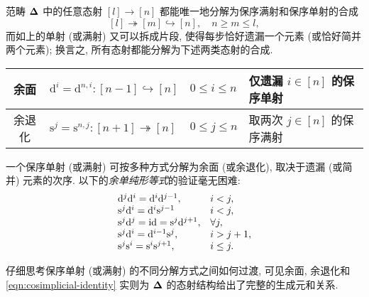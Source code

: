 范畴 $\bm\Delta$ 中的任意态射 $[l] \to [n]$ 都能唯一地分解为保序满射和保序单射的合成
\[ [l] \twoheadrightarrow [m] \hookrightarrow [n], \quad n \geq m \leq l, \]
而如上的单射 (或满射) 又可以拆成片段, 使得每步恰好遗漏一个元素 (或恰好简并两个元素); 换言之, 所有态射都能分解为下述两类态射的合成.
\begin{center}\begin{tabular}{|c|l|l|l|} \hline
	余面 & $\mathrm{d}^i = \mathrm{d}^{n, i}: [n-1] \hookrightarrow [n]$ & $0 \leq i \leq n$ & 仅遗漏 $i \in [n]$ 的保序单射 \\ \hline
	余退化 & $\mathrm{s}^j = \mathrm{s}^{n, j}: [n+1] \twoheadrightarrow [n]$ & $0 \leq j \leq n$ & 取两次 $j \in [n]$ 的保序满射 \\ \hline
\end{tabular}\end{center}

一个保序单射 (或满射) 可按多种方式分解为余面 (或余退化), 取决于遗漏 (或简并) 元素的次序. 以下的\emph{余单纯形等式}的验证毫无困难:
\begin{equation}\label{eqn:cosimplicial-identity}\begin{array}{ll}
	\mathrm{d}^j \mathrm{d}^i = \mathrm{d}^i \mathrm{d}^{j-1}, & i < j, \\
	\mathrm{s}^j \mathrm{d}^i = \mathrm{d}^i \mathrm{s}^{j-1} & i < j, \\
	\mathrm{s}^j \mathrm{d}^j = \mathrm{id} = \mathrm{s}^j \mathrm{d}^{j+1}, & \forall j, \\
	\mathrm{s}^j \mathrm{d}^i = \mathrm{d}^{i-1} \mathrm{s}^j, & i > j+1, \\
	\mathrm{s}^j \mathrm{s}^i = \mathrm{s}^i \mathrm{s}^{j+1}, & i \leq j.
\end{array}\end{equation}

仔细思考保序单射 (或满射) 的不同分解方式之间如何过渡, 可见余面, 余退化和 \eqref{eqn:cosimplicial-identity} 实则为 $\bm\Delta$ 的态射结构给出了完整的生成元和关系.

